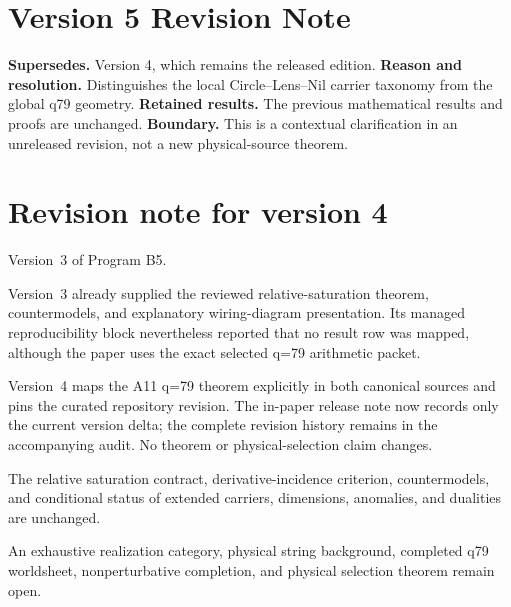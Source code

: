 \documentclass[11pt]{article}
\begin{document}
\section*{Version 5 Revision Note}
\noindent\textbf{Supersedes.} Version 4, which remains the released edition.
\textbf{Reason and resolution.} Distinguishes the local Circle--Lens--Nil carrier taxonomy from the global q79 geometry.
\textbf{Retained results.} The previous mathematical results and proofs are unchanged.
\textbf{Boundary.} This is a contextual clarification in an unreleased revision,
not a new physical-source theorem.

\section*{Revision note for version 4}

\begin{description}[leftmargin=2.5cm,style=nextline]
\item[Supersedes.]
Version~3 of Program B5.

\item[Reason.]
Version~3 already supplied the reviewed relative-saturation theorem,
countermodels, and explanatory wiring-diagram presentation.  Its managed
reproducibility block nevertheless reported that no result row was mapped,
although the paper uses the exact selected q=79 arithmetic packet.

\item[Resolution.]
Version~4 maps the A11 q=79 theorem explicitly in both canonical sources and
pins the curated repository revision.  The in-paper release note now records
only the current version delta; the complete revision history remains in the
accompanying audit.  No theorem or physical-selection claim changes.

\item[Retained content.]
The relative saturation contract, derivative-incidence criterion,
countermodels, and conditional status of extended carriers, dimensions,
anomalies, and dualities are unchanged.

\item[Open boundary.]
An exhaustive realization category, physical string background, completed
q79 worldsheet, nonperturbative completion, and physical selection theorem
remain open.
\end{description}

\begingroup
\footnotesize
\setlength{\parskip}{0pt}
\tableofcontents
\endgroup
\newpage
\end{document}
